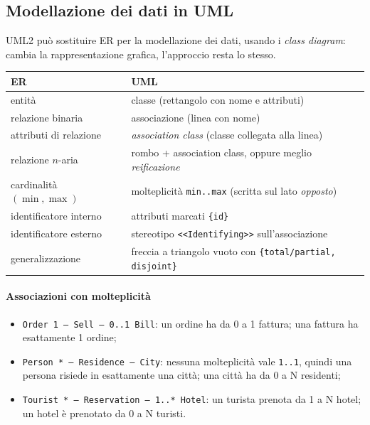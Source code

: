 \documentclass[a4paper,12pt]{article}
\begin{document}
\subsection{Modellazione dei dati in UML}

UML2 può sostituire ER per la modellazione dei dati, usando i \emph{class
diagram}: cambia la rappresentazione grafica, l'approccio resta lo stesso.

\begin{center}
\begin{tabular}{ll}
\textbf{ER} & \textbf{UML}\\ \hline
entità & classe (rettangolo con nome e attributi)\\
relazione binaria & associazione (linea con nome)\\
attributi di relazione & \emph{association class} (classe collegata alla linea)\\
relazione $n$-aria & rombo + association class, oppure meglio
  \emph{reificazione}\\
cardinalità $(\min,\max)$ & molteplicità \texttt{min..max} (scritta sul lato
  \emph{opposto})\\
identificatore interno & attributi marcati \texttt{\{id\}}\\
identificatore esterno & stereotipo \texttt{<<Identifying>>} sull'associazione\\
generalizzazione & freccia a triangolo vuoto con \texttt{\{total/partial,
  disjoint\}}\\
\end{tabular}
\end{center}

\paragraph{Associazioni con molteplicità}
\begin{itemize}
  \item \texttt{Order 1 --- Sell --- 0..1 Bill}: un ordine ha da 0 a 1
    fattura; una fattura ha esattamente 1 ordine;
  \item \texttt{Person * --- Residence --- City}: nessuna molteplicità vale
    \texttt{1..1}, quindi una persona risiede in esattamente una città; una
    città ha da 0 a N residenti;
  \item \texttt{Tourist * --- Reservation --- 1..* Hotel}: un turista prenota
    da 1 a N hotel; un hotel è prenotato da 0 a N turisti.
\end{itemize}
\end{document}
